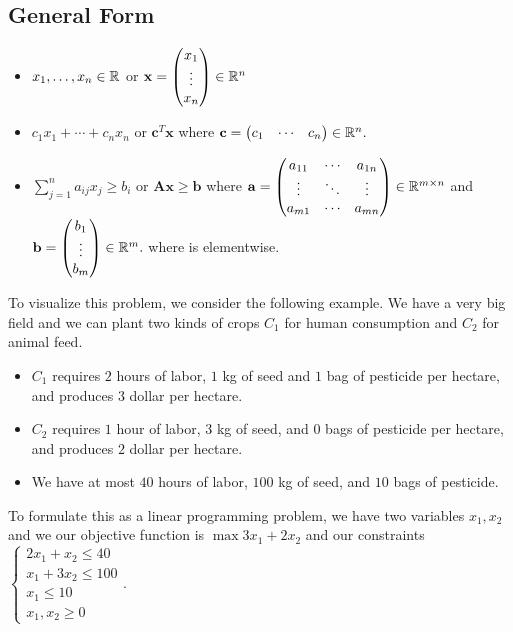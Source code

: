 \documentclass[a4paper,12pt]{article}
\begin{document}
\subsection{General Form}
\begin{itemize}
    \item {} $x_1,\dots,x_n\in\mathbb{R}$ or $\mathbf x=\begin{pmatrix}
    x_1\\
    \vdots\\
    x_n
    \end{pmatrix}\in\mathbb{R}^n$
    \item {} $c_1x_1+\cdots+c_nx_n$ or $\mathbf c^T\mathbf x$ where $\mathbf c=\begin{pmatrix}
    c_1&\cdots&c_n
    \end{pmatrix}\in\mathbb{R}^n.$
    \item {} $\sum_{j=1}^na_{ij}x_j\geq b_i$ or $\mathbf A\mathbf x\geq\mathbf b$ where $\mathbf a=\begin{pmatrix}
    a_{11}&\cdots&a_{1n}\\
    \vdots&\ddots&\vdots\\
    a_{m1}&\cdots&a_{mn}
    \end{pmatrix}\in\mathbb{R}^{m\times n}$ and $\mathbf b=\begin{pmatrix}
    b_1\\
    \vdots\\
    b_m
    \end{pmatrix}\in\mathbb{R}^m.$
    where is elementwise.
\end{itemize}
To visualize this problem, we consider the following example. We have a very big field and we can plant two kinds of crops $C_1$ for human consumption and $C_2$ for animal feed. \begin{itemize}
    \item $C_1$ requires $2$ hours of labor, $1$ kg of seed and $1$ bag of pesticide per hectare, and produces $3$ dollar per hectare.
    \item $C_2$ requires $1$ hour of labor, $3$ kg of seed, and $0$ bags of pesticide per hectare, and produces $2$ dollar per hectare.
    \item We have at most $40$ hours of labor, $100$ kg of seed, and $10$ bags of pesticide.
\end{itemize}
To formulate this as a linear programming problem, we have two variables $x_1,x_2$ and we our objective function is $\max{3x_1+2x_2}$ and our constraints $\begin{cases}
    2x_1+x_2\leq 40\\
    x_1+3x_2\leq 100\\
    x_1\leq 10\\
    x_1,x_2\geq 0
    \end{cases}.$
\end{document}
